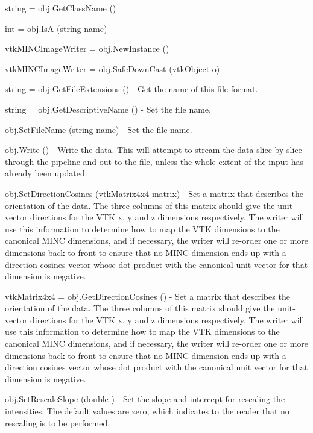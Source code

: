 \begin{DoxyItemize}
\item {\ttfamily string = obj.\-Get\-Class\-Name ()}  
\item {\ttfamily int = obj.\-Is\-A (string name)}  
\item {\ttfamily vtk\-M\-I\-N\-C\-Image\-Writer = obj.\-New\-Instance ()}  
\item {\ttfamily vtk\-M\-I\-N\-C\-Image\-Writer = obj.\-Safe\-Down\-Cast (vtk\-Object o)}  
\item {\ttfamily string = obj.\-Get\-File\-Extensions ()} -\/ Get the name of this file format.  
\item {\ttfamily string = obj.\-Get\-Descriptive\-Name ()} -\/ Set the file name.  
\item {\ttfamily obj.\-Set\-File\-Name (string name)} -\/ Set the file name.  
\item {\ttfamily obj.\-Write ()} -\/ Write the data. This will attempt to stream the data slice-\/by-\/slice through the pipeline and out to the file, unless the whole extent of the input has already been updated.  
\item {\ttfamily obj.\-Set\-Direction\-Cosines (vtk\-Matrix4x4 matrix)} -\/ Set a matrix that describes the orientation of the data. The three columns of this matrix should give the unit-\/vector directions for the V\-T\-K x, y and z dimensions respectively. The writer will use this information to determine how to map the V\-T\-K dimensions to the canonical M\-I\-N\-C dimensions, and if necessary, the writer will re-\/order one or more dimensions back-\/to-\/front to ensure that no M\-I\-N\-C dimension ends up with a direction cosines vector whose dot product with the canonical unit vector for that dimension is negative.  
\item {\ttfamily vtk\-Matrix4x4 = obj.\-Get\-Direction\-Cosines ()} -\/ Set a matrix that describes the orientation of the data. The three columns of this matrix should give the unit-\/vector directions for the V\-T\-K x, y and z dimensions respectively. The writer will use this information to determine how to map the V\-T\-K dimensions to the canonical M\-I\-N\-C dimensions, and if necessary, the writer will re-\/order one or more dimensions back-\/to-\/front to ensure that no M\-I\-N\-C dimension ends up with a direction cosines vector whose dot product with the canonical unit vector for that dimension is negative.  
\item {\ttfamily obj.\-Set\-Rescale\-Slope (double )} -\/ Set the slope and intercept for rescaling the intensities. The default values are zero, which indicates to the reader that no rescaling is to be performed.  

\end{DoxyItemize}
